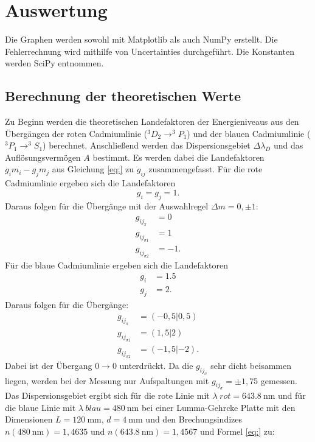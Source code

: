 \section{Auswertung}
\label{sec:Auswertung}

Die Graphen werden sowohl mit Matplotlib \cite{matplotlib} als auch NumPy \cite{numpy} erstellt. Die Fehlerrechnung wird mithilfe von Uncertainties \cite{uncertainties} durchgeführt. Die Konstanten werden SciPy \cite{scipy} entnommen.

\subsection{Berechnung der theoretischen Werte}

Zu Beginn werden die theoretischen Landefaktoren der Energieniveaus aus den Übergängen der roten Cadmiumlinie ($^3D_2 \rightarrow ^3P_1$) und der blauen Cadmiumlinie ($^3P_1 \rightarrow ^3S_1$) berechnet. 
Anschließend werden das Dispersionsgebiet $\Delta\lambda_D$ und das Auflösungsvermögen $A$ bestimmt.
Es werden dabei die Landefaktoren $g_im_i-g_jm_j$ aus Gleichung \ref{eq:} zu $g_{ij}$ zusammengefasst.
Für die rote Cadmiumlinie ergeben sich die Landefaktoren
\[
g_i=g_j=1\text{.}
\]
Daraus folgen für die Übergänge mit der Auswahlregel $\Delta m=0,\pm 1$:
\begin{align*}
g_{ij_\pi}&=0\\
g_{ij_{\sigma1}}&=1\\
g_{ij_{\sigma2}}&=-1 \text{.}
\end{align*}
Für die blaue Cadmiumlinie ergeben sich die Landefaktoren
\begin{align*}
g_i &= 1.5\\
g_j &= 2 \text{.}
\end{align*}
Daraus folgen für die Übergänge:
\begin{align*}
g_{ij_\pi}&=(-0,5|0,5)\\
g_{ij_{\sigma1}}&=(1,5|2)\\
g_{ij_{\sigma2}}&=(-1,5|-2) \text{.}
\end{align*}
Dabei ist der Übergang $0\rightarrow0$ unterdrückt.
Da die $g_{ij_{\sigma}}$ sehr dicht beisammen liegen, werden bei der Messung nur Aufspaltungen mit $g_{ij_\sigma} = \pm 1,75$ gemessen.
Das Dispersionsgebiet ergibt sich für die rote Linie mit $\lambda_.{rot}=\SI{643.8}{\nano\metre}$ und für die blaue Linie mit $\lambda_.{blau}=\SI{480}{\nano\metre}$ bei einer Lumma-Gehrcke Platte mit den Dimensionen $L=\SI{120}{\milli\metre}$, $d=\SI{4}{\milli\metre}$ und den Brechungsindizes $n(\SI{480}{\nano\metre})=1,4635$ und $n(\SI{643.8}{\nano\metre})=1,4567$ und Formel \eqref{eq:} zu:
